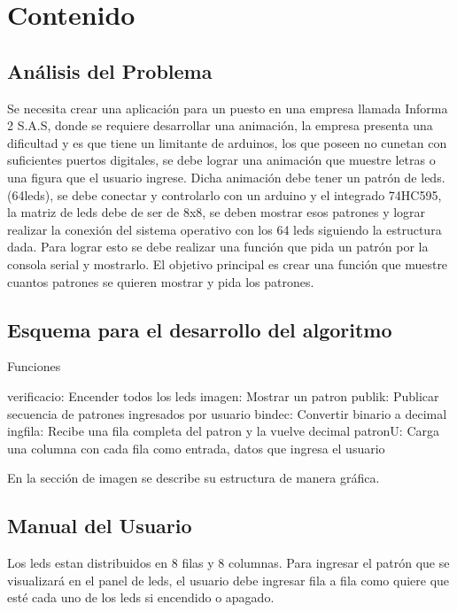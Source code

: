 \documentclass{article}
\begin{document}
\section{Contenido} \label{contenido}

\subsection{Análisis del Problema}

Se necesita crear una aplicación para un puesto en una empresa llamada Informa 2 S.A.S, donde se requiere desarrollar una animación, la empresa presenta una dificultad y es que tiene un limitante de arduinos, los que poseen no cunetan con suficientes puertos digitales, se debe lograr una animación que muestre letras o una figura que el usuario ingrese. Dicha animación debe tener un patrón de leds. (64leds), se debe conectar y controlarlo con un arduino y el integrado 74HC595, la matriz de leds debe de ser de 8x8, se deben mostrar esos patrones y lograr realizar la conexión del sistema operativo con los 64 leds siguiendo la estructura dada. Para lograr esto se debe realizar una función que pida un patrón por la consola serial y mostrarlo. El objetivo principal es crear una función que muestre cuantos patrones se quieren mostrar y pida los patrones.



\subsection{Esquema para el desarrollo del algoritmo}

Funciones

verificacio:
            Encender todos los leds
imagen:
            Mostrar un patron
publik:
            Publicar secuencia de patrones ingresados por usuario
bindec:
            Convertir binario a decimal
ingfila:    
            Recibe una fila completa del patron y la vuelve decimal
patronU:
            Carga una columna con cada fila como entrada, datos que ingresa el usuario

En la sección de imagen se describe su estructura de manera gráfica.

\subsection{Manual del Usuario}

Los leds estan distribuidos en 8 filas y 8 columnas.
Para ingresar el patrón que se visualizará en el panel de leds, el usuario debe ingresar fila a fila como quiere que esté cada uno de los leds si encendido o apagado.
\vspace{0.5cm}
\end{document}
